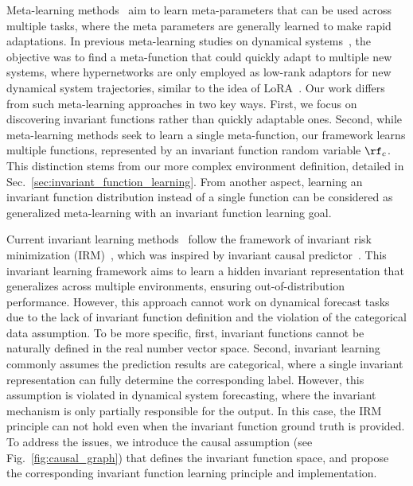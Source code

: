 Meta-learning methods~\citep{finn2017model,rusu2018meta,li2017meta,zintgraf2019fast,perez2018film} aim to learn meta-parameters that can be used across multiple tasks, where the meta parameters are generally learned to make rapid adaptations. In previous meta-learning studies on dynamical systems~\citep{Kirchmeyer2022coda,wang2022meta, yin2021leads}, the objective was to find a meta-function that could quickly adapt to multiple new systems, where hypernetworks are only employed as low-rank adaptors for new dynamical system trajectories, similar to the idea of LoRA~\citep{hu2021lora}. Our work differs from such meta-learning approaches in two key ways. First, we focus on discovering invariant functions rather than quickly adaptable ones. Second, while meta-learning methods seek to learn a single meta-function, our framework learns multiple functions, represented by an invariant function random variable $\rf_c$. This distinction stems from our more complex environment definition, detailed in Sec.~\ref{sec:invariant_function_learning}. From another aspect, learning an invariant function distribution instead of a single function can be considered as generalized meta-learning with an invariant function learning goal. 


Current invariant learning methods~\citep{arjovsky2019invariant,lu2021invariant,rosenfeld2020risks,krueger2021out,sagawa2019distributionally} follow the framework of invariant risk minimization (IRM)~\citep{arjovsky2019invariant}, which was inspired by invariant causal predictor~\citep{peters2016causal}. This invariant learning framework aims to learn a hidden invariant representation that generalizes across multiple environments, ensuring out-of-distribution performance. However, this approach cannot work on dynamical forecast tasks due to the lack of invariant function definition and the violation of the categorical data assumption. To be more specific, first, invariant functions cannot be naturally defined in the real number vector space. Second, invariant learning commonly assumes the prediction results are categorical, where a single invariant representation can fully determine the corresponding label. However, this assumption is violated in dynamical system forecasting, where the invariant mechanism is only partially responsible for the output. In this case, the IRM principle can not hold even when the invariant function ground truth is provided. To address the issues, we introduce the causal assumption (see Fig.~\ref{fig:causal_graph}) that defines the invariant function space, and propose the corresponding invariant function learning principle and implementation.

